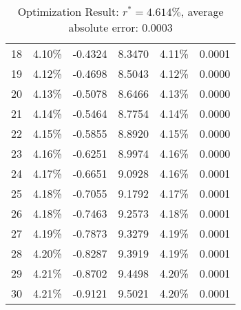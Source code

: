 \begin{table}[ht]
\begin{tabular}{@{}cccccc@{}}
18       & 4.10\%        & -0.4324 & 8.3470 & 4.11\%       & 0.0001         \\
19       & 4.12\%        & -0.4698 & 8.5043 & 4.12\%       & 0.0000         \\
20       & 4.13\%        & -0.5078 & 8.6466 & 4.13\%       & 0.0000         \\
21       & 4.14\%        & -0.5464 & 8.7754 & 4.14\%       & 0.0000         \\
22       & 4.15\%        & -0.5855 & 8.8920 & 4.15\%       & 0.0000         \\
23       & 4.16\%        & -0.6251 & 8.9974 & 4.16\%       & 0.0000         \\
24       & 4.17\%        & -0.6651 & 9.0928 & 4.16\%       & 0.0001         \\
25       & 4.18\%        & -0.7055 & 9.1792 & 4.17\%       & 0.0001         \\
26       & 4.18\%        & -0.7463 & 9.2573 & 4.18\%       & 0.0001         \\
27       & 4.19\%        & -0.7873 & 9.3279 & 4.19\%       & 0.0001         \\
28       & 4.20\%        & -0.8287 & 9.3919 & 4.19\%       & 0.0001         \\
29       & 4.21\%        & -0.8702 & 9.4498 & 4.20\%       & 0.0001         \\
30       & 4.21\%        & -0.9121 & 9.5021 & 4.20\%       & 0.0001         \\ \bottomrule
\end{tabular}
\caption{Optimization Result: $r^* = 4.614\%$, average absolute error: 0.0003}
\label{tab:prob4-result}
\end{table}
